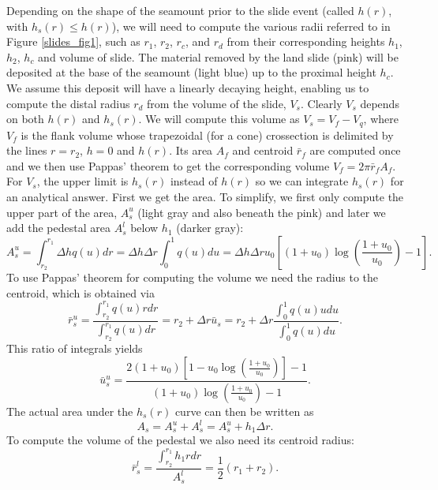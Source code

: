 \documentclass[12pt,letterpaper,margin=0.5in]{report}
\begin{document}
Depending on the shape of the seamount prior to the slide event (called $h(r)$, with $h_s(r) \le h(r)$), we will need to compute the various radii referred
to in Figure \ref{slides_fig1}, such as $r_1$, $r_2$, $r_c$, and $r_d$ from their corresponding heights $h_1$, $h_2$, $h_c$ and volume of slide.
The material removed by the land slide (pink)
will be deposited at the base of the seamount (light blue) up to the proximal height $h_c$.  We assume this deposit will have a linearly
decaying height, enabling us to compute the distal radius $r_d$ from the volume of the slide, $V_s$.  Clearly $V_s$ depends
on both $h(r)$ and $h_s(r)$.  We will compute this volume as $V_s = V_f - V_q$, where $V_f$ is the flank volume whose
trapezoidal (for a cone) crossection is delimited by the lines $r = r_2$, $h = 0$ and $h(r)$.  Its area $A_f$ and centroid $\bar{r}_f$ are computed once and
we then use Pappas' theorem to get the corresponding volume $V_f = 2 \pi \bar{r}_f A_f$.  For $V_s$, the upper limit is $h_s(r)$ instead of $h(r)$ so we can integrate
$h_s(r)$ for an analytical answer. First we get the area. To simplify, we first only compute the upper part of the area, $A^u_s$ (light gray and also beneath the pink)
and later we add the pedestal area $A^l_s$ below $h_1$ (darker gray):
\begin{equation}
A^u_s = \int_{r_2}^{r_1} \Delta h q(u) dr = \Delta h \Delta r \int_0^1 q(u) du = \Delta h \Delta r u_0 \left [ (1 + u_0) \log \left (\frac{1 + u_0}{u_0} \right ) - 1 \right ].
\end{equation}
To use Pappas' theorem for computing the volume we need the radius to the centroid, which is obtained via
\begin{equation}
\bar{r}^u_s = \frac{\int_{r_2}^{r_1}q(u)rdr}{\int_{r_2}^{r_1}q(u)dr} = r_2 + \Delta r \bar{u}_s = r_2 + \Delta r \frac{\int_0^1q(u)udu}{\int_0^1 q(u)du}.
\end{equation}
This ratio of integrals yields
\begin{equation}
\bar{u}^u_s = \frac{2(1 + u_0)\left [1 - u_0 \log \left ( \frac{1+u_0}{u_0} \right ) \right ] - 1}{(1 + u_0) \log \left (\frac{1 + u_0}{u_0} \right ) - 1}.
\end{equation}
The actual area under the $h_s(r)$ curve can then be written as
\begin{equation}
A_s = A^u_s + A^l_s = A^u_s + h_1 \Delta r.
\end{equation}
To compute the volume of the pedestal we also need its centroid radius:
\begin{equation}
\bar{r}^l_s = \frac{\int_{r_2}^{r_1} h_1 rdr}{A^l_s} = \frac{1}{2} (r_1 + r_2).
\end{equation}
\end{document}
